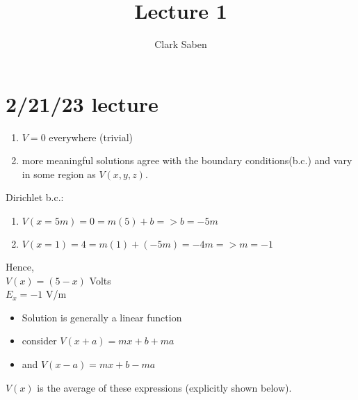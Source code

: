 \documentclass{article}
\title{Lecture 1}
\author{Clark Saben}
\begin{document}
\newcommand{\pz}{\ket{\vb{+z}}}
\newcommand{\nz}{\ket{\vb{-z}}}
\newcommand{\px}{\ket{\vb{+x}}}
\newcommand{\nx}{\ket{\vb{-x}}}
\newcommand{\py}{\ket{\vb{+z}}}
\newcommand{\ny}{\ket{\vb{-y}}}

\newcommand{\pxexpr}{ \frac{1}{\sqrt{2}} \pz + \frac{1}{\sqrt{2}} \nz}
\newcommand{\nxexpr}{ \frac{1}{\sqrt{2}} \pz - \frac{1}{\sqrt{2}} \nz}
\newcommand{\pyexpr}{ \frac{1}{\sqrt{2}} \pz + \frac{i}{\sqrt{2}} \nz}
\newcommand{\nyexpr}{ \frac{1}{\sqrt{2}} \pz - \frac{i}{\sqrt{2}} \nz}
\maketitle

\section{2/21/23 lecture}

\begin{enumerate}
	\item $V=0$ everywhere (trivial)
	\item more meaningful solutions agree with the boundary conditions(b.c.) and vary in some region as $V(x,y,z)$.
\end{enumerate}

Dirichlet b.c.:\\
\begin{enumerate}
\item $V(x=5m)= 0 = m(5) +b  => b=-5m$
\item $V(x=1)= 4 = m(1) + (-5m) = -4m => m=-1$
\end{enumerate}

Hence,\\

$V(x) = (5-x )$ Volts \\
$E_x = -1$ V/m \\

\begin{itemize}
	\item Solution is generally a linear function
	\item consider $V(x+a) = mx + b  + ma$
	\item and      $V(x-a) = mx + b  - ma$\\
\end{itemize}

$V(x)$ is the average of these expressions (explicitly shown below).\\
\end{document}
